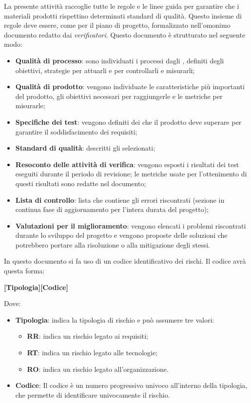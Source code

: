 La presente attività raccoglie tutte le regole e le linee guida per garantire che i materiali prodotti rispettino 
determinati standard di qualità. Questo insieme di regole deve essere, come per il piano di progetto, formalizzato 
nell'omonimo documento redatto dai \emph{verificatori}.
Questo documento è strutturato nel seguente modo:
\begin{itemize}
    \item \textbf{Qualità di processo}: sono individuati i processi dagli , definiti 
    degli obiettivi, strategie per attuarli e  per controllarli e misurarli;
    \item \textbf{Qualità di prodotto}: vengono individuate le caratteristiche più importanti del prodotto, gli 
    obiettivi necessari per raggiungerle e le metriche per misurarle;
    \item \textbf{Specifiche dei test}: vengono definiti dei  che il prodotto deve superare per 
    garantire il soddisfacimento dei requisiti;
    \item \textbf{Standard di qualità}: descritti gli  selezionati;
    \item \textbf{Resoconto delle attività di verifica}: vengono esposti i risultati dei test eseguiti durante il 
    periodo di revisione; le metriche usate per l'ottenimento di questi risultati sono redatte nel documento;
    \item \textbf{Lista di controllo}:  lista che contiene gli errori riscontrati (sezione in continua fase di 
    aggiornamento per l'intera durata del progetto);
    \item \textbf{Valutazioni per il miglioramento}: vengono elencati i problemi riscontrati durante lo sviluppo del 
    progetto e vengono proposte delle soluzioni che potrebbero portare alla risoluzione o alla mitigazione degli stessi.
\end{itemize} 
In questo documento si fa uso di un codice identificativo dei rischi. Il codice avrà questa forma:
\begin{center}
	\textbf{[Tipologia][Codice]}
\end{center}
Dove:
\begin{itemize}

	\item \textbf{Tipologia}: indica la tipologia di rischio e può assumere tre valori:
	\begin{itemize}
		\item \textbf{RR}: indica un rischio legato ai requisiti;
		\item \textbf{RT}: indica un rischio legato alle tecnologie;
		\item \textbf{RO}: indica un rischio legato all'organizzazione.
	\end{itemize}
    \item \textbf{Codice}: Il codice è un numero progressivo univoco all'interno della tipologia, che permette di 
    identificare univocamente il rischio.
\end{itemize}

